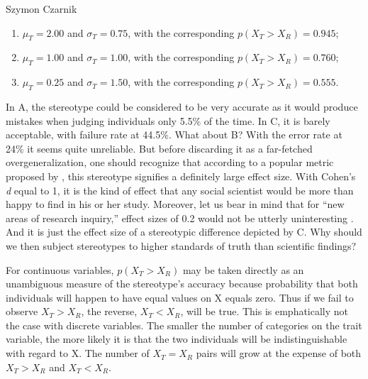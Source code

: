 \begin{artengenv}{Szymon Czarnik}
\begin{enumerate}
\item
  \(\mu_{T} = 2.00\) and \(\sigma_{T} = 0.75\), with the corresponding
  \(p\left( X_{T} > X_{R} \right) = 0.945\);
\item
  \(\mu_{T} = 1.00\) and \(\sigma_{T} = 1.00\), with the corresponding
  \(p\left( X_{T} > X_{R} \right) = 0.760\);
\item
  \(\mu_{T} = 0.25\) and \(\sigma_{T} = 1.50\), with the corresponding
  \(p\left( X_{T} > X_{R} \right) = 0.555\).
\end{enumerate}
In A, the stereotype could be considered to be very accurate as it would produce mistakes when judging individuals only 5.5\% of the time. In C, it is barely acceptable, with failure rate at 44.5\%. What about B? With the error rate at 24\% it seems quite unreliable. But before discarding it as a far-fetched overgeneralization, one should recognize that according to a popular metric proposed by
\parencite[][]{cohen_statistical_1988}, %
 this stereotype signifies a definitely large effect size. With Cohen's \textit{d} equal to 1, it is the kind of effect that any social scientist would be more than happy to find in his or her study. Moreover, let us bear in mind that for ``new areas of research inquiry,'' effect sizes of 0.2 would not be utterly uninteresting 
\parencite[][p.25]{cohen_statistical_1988}. %
 And it is just the effect size of a stereotypic difference depicted by C. Why should we then subject stereotypes to higher standards of truth than scientific findings?

For continuous variables, \(p\left( X_{T} > X_{R} \right)\) may be taken
directly as an unambiguous measure of the stereotype's accuracy because
probability that both individuals will happen to have equal values on X
equals zero. Thus if we fail to observe \(X_{T} > X_{R}\), the reverse,
\(X_{T} < X_{R}\), will be true. This is emphatically not the case with
discrete variables. The smaller the number of categories on the trait
variable, the more likely it is that the two individuals will be
indistinguishable with regard to X. The number of \(X_{T} = X_{R}\)
pairs will grow at the expense of both \(X_{T} > X_{R}\) and
\(X_{T} < X_{R}\).


\end{artengenv}

